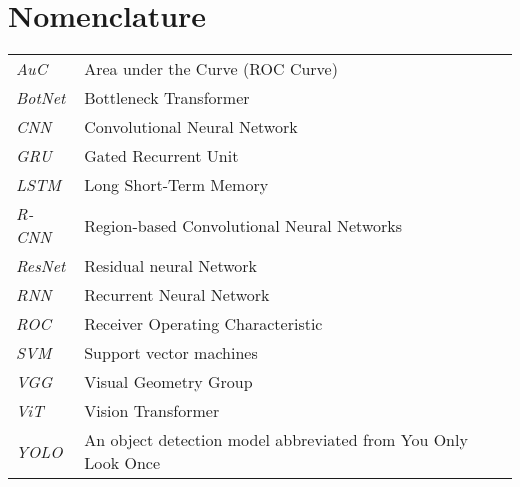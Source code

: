\newpage
\makeatletter
\let\mcnewpage=\newpage
\newcommand{\TrickSupertabularIntoMulticols}{%
  \renewcommand\newpage{%
    \if@firstcolumn
      \hrule width\linewidth height0pt
      \columnbreak
    \else
      \mcnewpage
    \fi
  }%
}
\makeatother
\chapter{Nomenclature}
\begin{changemargin}{-0.5cm}{0cm}
\begin{multicols*}{2}
\TrickSupertabularIntoMulticols
\begin{supertabular}{>{\em}lp{6.2cm}}
AuC & Area under the Curve (ROC Curve) \\ [.5em]
BotNet & Bottleneck Transformer \\ [.5em]
CNN & Convolutional Neural Network \\ [.5em]
GRU & Gated Recurrent Unit \\ [.5em]
LSTM & Long Short-Term Memory \\ [.5em]
R-CNN & Region-based Convolutional Neural Networks \\ [.5em]
ResNet & Residual neural Network \\ [.5em]
RNN & Recurrent Neural Network \\ [.5em]
ROC & Receiver Operating Characteristic \\ [.5em]
SVM & Support vector machines \\ [.5em]
VGG & Visual Geometry Group \\ [.5em]
ViT & Vision Transformer \\ [.5em]
YOLO & An object detection model abbreviated from You Only Look Once \\ [.5em]
\end{supertabular}
\end{multicols*}
\end{changemargin}